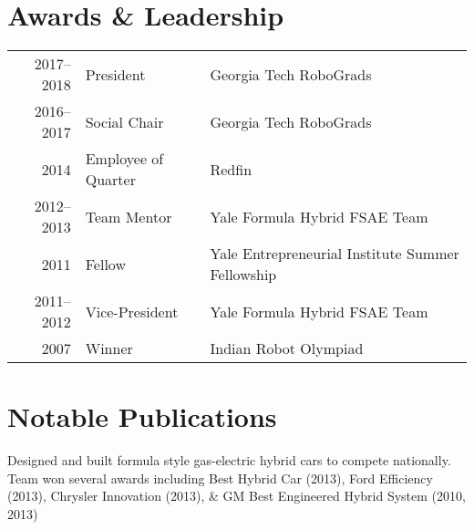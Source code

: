 \documentclass[]{deedy-resume}
\begin{document}
\begin{minipage}[t]{0.66\textwidth}
\section{Awards \& Leadership}
\begin{tabular}{rll}
2017--2018 & President & Georgia Tech RoboGrads \\
2016--2017 & Social Chair & Georgia Tech RoboGrads \\
2014 & Employee of Quarter & Redfin \\
2012--2013 & Team Mentor & Yale Formula Hybrid FSAE Team \\
2011 & Fellow & Yale Entrepreneurial Institute Summer Fellowship \\
2011--2012 & Vice-President & Yale Formula Hybrid FSAE Team \\
2007 & Winner & Indian Robot Olympiad
\end{tabular}
\sectionsep


\section{Notable Publications}
\renewcommand\refname{\vskip -0.8cm} %


\nocite{*}



Designed and built formula style gas-electric hybrid cars to compete nationally. Team won several awards including Best Hybrid Car (2013), Ford Efficiency (2013), Chrysler Innovation (2013), \& GM Best Engineered Hybrid System (2010, 2013)
\sectionsep

\end{minipage}
\end{document}
